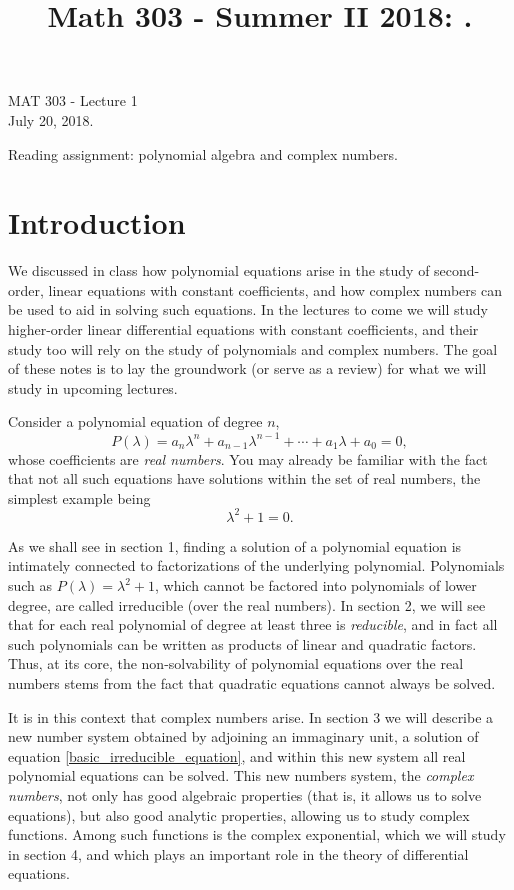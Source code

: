 \documentclass[12pt,oneside]{exam}
\title{Math 303 - Summer II 2018: . }
\begin{document}
\begin{flushright}
\sc MAT 303 - Lecture 1\\
July 20, 2018.
\end{flushright}
\bigskip

\begin{center}
\textsf{Reading assignment: polynomial algebra and complex numbers.} 
\end{center}

\section{Introduction}
We discussed in class how polynomial equations arise in the study of second-order, linear equations with constant coefficients, and how complex numbers can be used to aid in solving such equations. In the lectures to come we will study higher-order linear differential equations with constant coefficients, and their study too will rely on the study of polynomials and complex numbers. The goal of these notes is to lay the groundwork (or serve as a review) for what we will study in upcoming lectures. 

Consider a polynomial equation of degree $n$, 
\begin{equation}\label{basic_equation}
P(\lambda)=a_n\lambda^n+a_{n-1}\lambda^{n-1}+ \cdots + a_1\lambda + a_0=0,
\end{equation}
whose coefficients are \textit{real numbers}. You may already be familiar with the fact that not all such equations have solutions within the set of real numbers, the simplest example being 
\begin{equation}\label{basic_irreducible_equation}
\lambda^2+1 =0.
\end{equation}

As we shall see in section 1, finding a solution of a polynomial equation is intimately connected to factorizations of the underlying polynomial. Polynomials such as $P(\lambda)=\lambda^2+1$, which cannot be factored into polynomials of lower degree, are called irreducible (over the real numbers). In section 2, we will see that for each real polynomial of degree at least three is \textit{reducible}, and in fact all such polynomials can be written as products of linear and quadratic factors. Thus, at its core, the non-solvability of polynomial equations over the real numbers stems from the fact that quadratic equations cannot always be solved. 

It is in this context that complex numbers arise. In section 3 we will describe a new number system obtained  by adjoining an immaginary unit, a solution of equation \eqref{basic_irreducible_equation}, and within this new system all real polynomial equations can be solved. This new numbers system, the \textit{complex numbers}, not only has good algebraic properties (that is, it allows us to solve equations), but also good analytic properties, allowing us to study complex functions. Among such functions is the complex exponential, which we will study in section 4, and which plays an important role in the theory of differential equations.  
\end{document}
